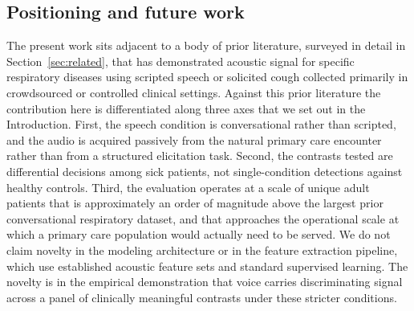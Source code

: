 \documentclass[utf8]{FrontiersinHarvard} %
\begin{document}
\subsection{Positioning and future work}
\label{sec:discussion-future}

The present work sits adjacent to a body of prior literature, surveyed in detail in Section~\ref{sec:related}, that has demonstrated acoustic signal for specific respiratory diseases using scripted speech or solicited cough collected primarily in crowdsourced or controlled clinical settings. Against this prior literature the contribution here is differentiated along three axes that we set out in the Introduction. First, the speech condition is conversational rather than scripted, and the audio is acquired passively from the natural primary care encounter rather than from a structured elicitation task. Second, the contrasts tested are differential decisions among sick patients, not single-condition detections against healthy controls. Third, the evaluation operates at a scale of unique adult patients that is approximately an order of magnitude above the largest prior conversational respiratory dataset, and that approaches the operational scale at which a primary care population would actually need to be served. We do not claim novelty in the modeling architecture or in the feature extraction pipeline, which use established acoustic feature sets and standard supervised learning. The novelty is in the empirical demonstration that voice carries discriminating signal across a panel of clinically meaningful contrasts under these stricter conditions.
\end{document}
